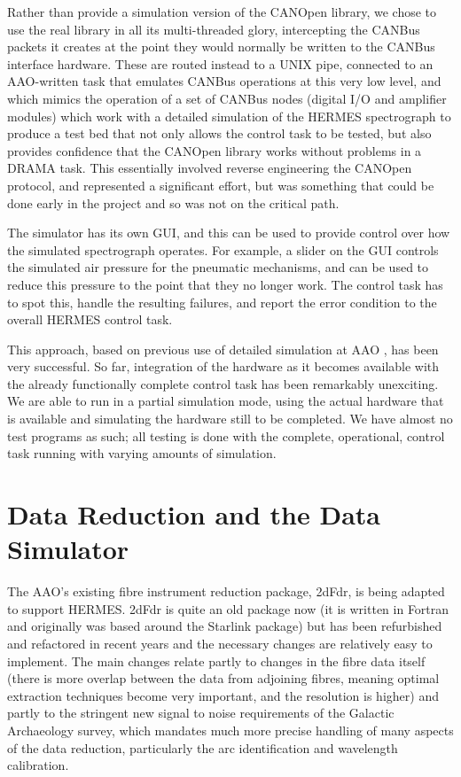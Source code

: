 Rather than provide a simulation version of the CANOpen library, we chose to use the real library in all its multi-threaded glory, intercepting the CANBus packets it creates at the point they would normally be written to the CANBus interface hardware. These are routed instead to a UNIX pipe, connected to an AAO-written task that emulates CANBus operations at this very low level, and which mimics the operation of a set of CANBus nodes (digital I/O and amplifier modules) which work with a detailed simulation of the HERMES spectrograph to produce a test bed that not only allows the control task to be tested, but also provides confidence that the CANOpen library works without problems in a DRAMA task. This essentially involved reverse engineering the CANOpen protocol, and represented a significant effort, but was something that could be done early in the project and so was not on the critical path.

The simulator has its own GUI, and this can be used to provide control over how the simulated spectrograph operates. For example, a slider on the GUI controls the simulated air pressure for the pneumatic mechanisms, and can be used to reduce this pressure to the point that they no longer work. The control task has to spot this, handle the resulting failures, and report the error condition to the overall HERMES control task.

This approach, based on previous use of detailed simulation at AAO \citep{TCS_2010}, has been very successful. So far, integration of the hardware as it becomes available with the already functionally complete control task has been remarkably unexciting. We are able to run in a partial simulation mode, using the actual hardware that is available and simulating the hardware still to be completed. We have almost no test programs as such; all testing is done with the complete, operational, control task running with varying amounts of simulation.

\section{Data Reduction and the Data Simulator}

The AAO's existing fibre instrument reduction package, 2dFdr, is being adapted to support HERMES. 2dFdr is quite an old package now (it is written in Fortran and originally was based around the Starlink package) but has been refurbished and refactored in recent years and the necessary changes are relatively easy to implement. The main changes relate partly to changes in the fibre data itself (there is more overlap between the data from adjoining fibres, meaning optimal extraction techniques become very important, and the resolution is higher) and partly to the stringent new signal to noise requirements of the Galactic Archaeology survey, which mandates much more precise handling of many aspects of the data reduction, particularly the arc identification and wavelength calibration.

